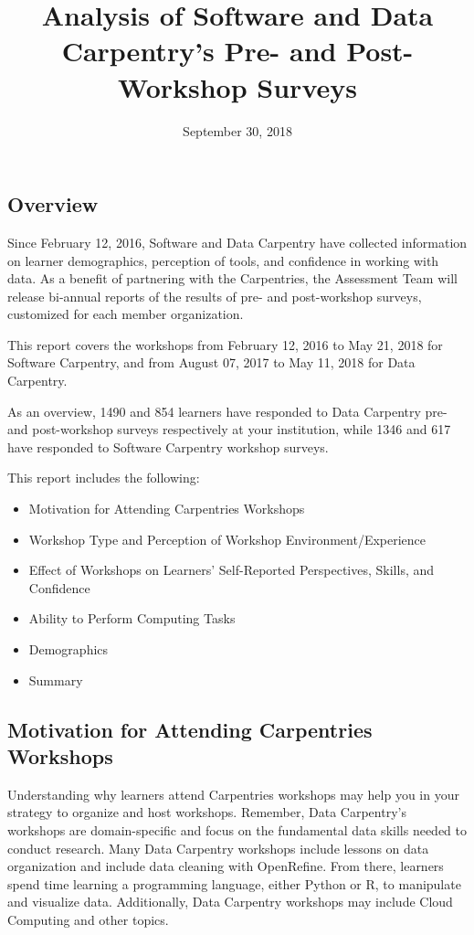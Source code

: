 \documentclass[]{article}
\title{Analysis of Software and Data Carpentry's Pre- and Post-Workshop Surveys}
\author{}
\date{September 30, 2018}
\providecommand{\tightlist}{%
  \setlength{\itemsep}{0pt}\setlength{\parskip}{0pt}}
\begin{document}
\maketitle

{
\setcounter{tocdepth}{2}
\tableofcontents
}
\subsection{Overview}\label{overview}

Since February 12, 2016, Software and Data Carpentry have collected
information on learner demographics, perception of tools, and confidence
in working with data. As a benefit of partnering with the Carpentries,
the Assessment Team will release bi-annual reports of the results of
pre- and post-workshop surveys, customized for each member organization.

This report covers the workshops from February 12, 2016 to May 21, 2018
for Software Carpentry, and from August 07, 2017 to May 11, 2018 for
Data Carpentry.

As an overview, 1490 and 854 learners have responded to Data Carpentry
pre- and post-workshop surveys respectively at your institution, while
1346 and 617 have responded to Software Carpentry workshop surveys.

This report includes the following:

\begin{itemize}
\tightlist
\item
  Motivation for Attending Carpentries Workshops
\item
  Workshop Type and Perception of Workshop Environment/Experience
\item
  Effect of Workshops on Learners' Self-Reported Perspectives, Skills,
  and Confidence
\item
  Ability to Perform Computing Tasks
\item
  Demographics
\item
  Summary
\end{itemize}

\subsection{Motivation for Attending Carpentries
Workshops}\label{motivation-for-attending-carpentries-workshops}

Understanding why learners attend Carpentries workshops may help you in
your strategy to organize and host workshops. Remember, Data Carpentry's
workshops are domain-specific and focus on the fundamental data skills
needed to conduct research. Many Data Carpentry workshops include
lessons on data organization and include data cleaning with OpenRefine.
From there, learners spend time learning a programming language, either
Python or R, to manipulate and visualize data. Additionally, Data
Carpentry workshops may include Cloud Computing and other topics.
\end{document}
